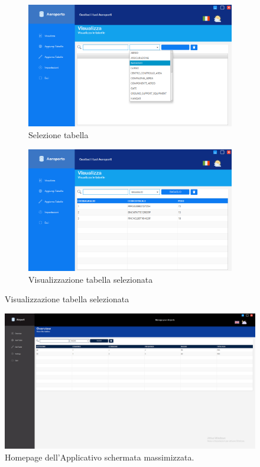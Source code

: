 \begin{figure}[ht]
	\begin{subfigure}{.6\textwidth}
		\centering
		\includegraphics[width=1\linewidth]{./img/Applicativo/homepage_overview_table_selection.png}
		\caption{Selezione tabella}
		\label{fig:overview1}
	\end{subfigure}%
	\begin{subfigure}{.6\textwidth}
		\centering
		\includegraphics[width=1\linewidth]{./img/Applicativo/homepage_overview_table_selection2.png}
		\caption{Visualizzazione tabella selezionata}
		\label{fig:overview2}
	\end{subfigure}
	\label{fig:overviews}
\end{figure}


\begin{figure}[H] 
\centering
\includegraphics[width=1\textwidth, height=1\textheight, keepaspectratio]{./img/Applicativo/maximize.png}
\caption{Homepage dell'Applicativo schermata massimizzata.}
\label{fig:maximize}
\end{figure}


